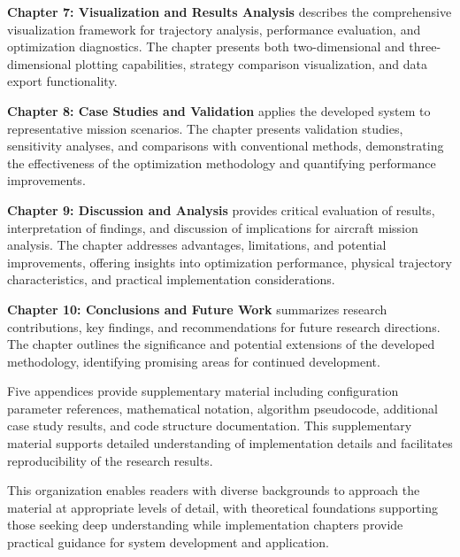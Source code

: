 \textbf{Chapter 7: Visualization and Results Analysis} describes the comprehensive visualization framework for trajectory analysis, performance evaluation, and optimization diagnostics. The chapter presents both two-dimensional and three-dimensional plotting capabilities, strategy comparison visualization, and data export functionality.

\textbf{Chapter 8: Case Studies and Validation} applies the developed system to representative mission scenarios. The chapter presents validation studies, sensitivity analyses, and comparisons with conventional methods, demonstrating the effectiveness of the optimization methodology and quantifying performance improvements.

\textbf{Chapter 9: Discussion and Analysis} provides critical evaluation of results, interpretation of findings, and discussion of implications for aircraft mission analysis. The chapter addresses advantages, limitations, and potential improvements, offering insights into optimization performance, physical trajectory characteristics, and practical implementation considerations.

\textbf{Chapter 10: Conclusions and Future Work} summarizes research contributions, key findings, and recommendations for future research directions. The chapter outlines the significance and potential extensions of the developed methodology, identifying promising areas for continued development.

Five appendices provide supplementary material including configuration parameter references, mathematical notation, algorithm pseudocode, additional case study results, and code structure documentation. This supplementary material supports detailed understanding of implementation details and facilitates reproducibility of the research results.

This organization enables readers with diverse backgrounds to approach the material at appropriate levels of detail, with theoretical foundations supporting those seeking deep understanding while implementation chapters provide practical guidance for system development and application.

